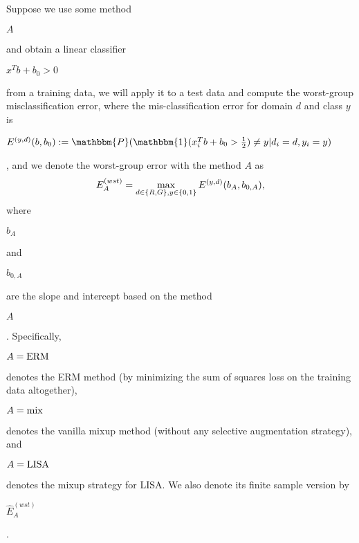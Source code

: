 Suppose we use some method \begin{small}$A$\end{small} and obtain a linear classifier \begin{small}$x^Tb+b_0>0$\end{small} from a training data, we will apply it to a test data and compute the worst-group misclassification error, where the mis-classification error for domain $d$ and class $y$ is \begin{small}$E^{(y,d)}(b,b_0):=  \mathbbm{P}(\mathbbm{1}(x_i^Tb+b_0>\frac{1}{2})\neq y|d_i=d,y_i=y)$\end{small}, 
and we denote the worst-group error with the method $A$ as
\begin{equation}
\nonumber
\small
E^{(wst)}_A= \max_{d\in\{R,G\},y\in\{0,1\}}E^{(y,d)}(b_A,b_{0,A}),
\end{equation}
where \begin{small}$b_A$\end{small} and \begin{small}$b_{0,A}$\end{small} are the slope and intercept based on the method \begin{small}$A$\end{small}. Specifically, \begin{small}$A=\textup{ERM}$\end{small} denotes the ERM method (by minimizing the sum of squares loss on the training data altogether), \begin{small}$A=\textup{mix}$\end{small} denotes the vanilla mixup method (without any selective augmentation strategy), and \begin{small}$A=\textup{LISA}$\end{small} denotes the mixup strategy for LISA. We also denote its finite sample version by \begin{small}$\hat E_A^{(wst)}$\end{small}.


